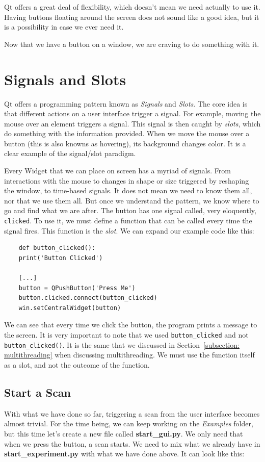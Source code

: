 Qt offers a great deal of flexibility, which doesn't mean we need actually to use it. Having buttons floating around the screen does not sound like a good idea, but it is a possibility in case we ever need it.

Now that we have a button on a window, we are craving to do something with it.


\section{Signals and Slots}\label{sec:signals-slots}
Qt offers a programming pattern known as \emph{Signals} and \emph{Slots}. The core idea is that different actions on a user interface trigger a signal. For example, moving the mouse over an element triggers a signal. This signal is then caught by \emph{slots}, which do something with the information provided. When we move the mouse over a button (this is also knowns as hovering), its background changes color. It is a clear example of the signal/slot paradigm.

Every Widget that we can place on screen has a myriad of signals. From interactions with the mouse to changes in shape or size triggered by reshaping the window, to time-based signals. It does not mean we need to know them all, nor that we use them all. But once we understand the pattern, we know where to go and find what we are after. The button has one signal called, very eloquently, \texttt{clicked}. To use it, we must define a function that can be called every time the signal fires. This function is the \emph{slot}. We can expand our example code like this:

\begin{verbatim}
    def button_clicked():
    print('Button Clicked')

    [...]
    button = QPushButton('Press Me')
    button.clicked.connect(button_clicked)
    win.setCentralWidget(button)
\end{verbatim}

We can see that every time we click the button, the program prints a message to the screen. It is very important to note that we used \texttt{button\_clicked} and not \texttt{button\_clicked()}. It is the same that we discussed in Section~\ref{subsection: multithreading} when discussing multithreading. We must use the function itself as a slot, and not the outcome of the function.

\subsection{Start a Scan}\label{subsec:start-scan-gui}
With what we have done so far, triggering a scan from the user interface becomes almost trivial. For the time being, we can keep working on the \emph{Examples} folder, but this time let's create a new file called \textbf{start\_gui.py}. We only need that when we press the button, a scan starts. We need to mix what we already have in \textbf{start\_experiment.py} with what we have done above. It can look like this:

